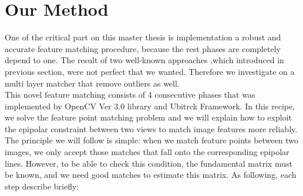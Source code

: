 \section {Our Method}
One of the critical part on this master thesis is implementation a robust and accurate feature matching procedure, because the rest phases are completely depend to one. The result of two well-known approaches ,which introduced in previous section, were not perfect that we wanted. Therefore we investigate on a multi layer matcher that remove outliers as well.\\
This novel feature matching consists of 4 consecutive phases that was implemented by OpenCV Ver 3.0 library and Ubitrck Framework. In this recipe, we solve the feature point matching problem and we will explain how to exploit the epipolar constraint between two views to match image features more reliably.\\
The principle we will follow is simple: when we match feature points between two images, we only accept those matches that fall onto the corresponding epipolar lines. However, to be able to check this condition, the fundamental matrix must be known, and we need good matches to estimate this matrix. 
As following, each step describe briefly:
